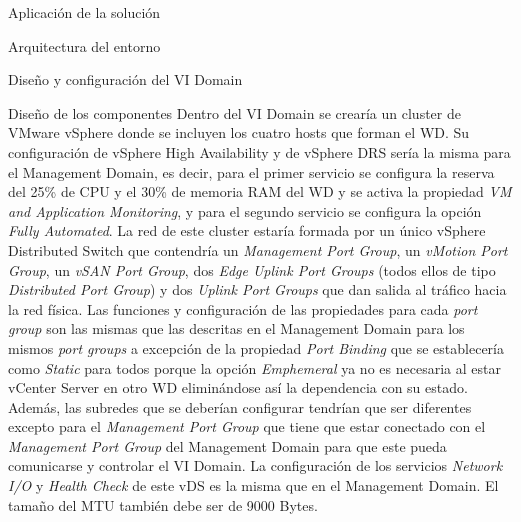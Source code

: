 \begin{chapter}{Aplicación de la solución}
\begin{section}{Arquitectura del entorno}
\begin{subsection}{Diseño y configuración del VI Domain}
\begin{subsubsection}{Diseño de los componentes}
        Dentro del VI Domain se crearía un cluster de VMware vSphere donde se incluyen los cuatro hosts que forman el WD. Su configuración de vSphere High Availability y de vSphere DRS sería la misma para el Management Domain, es decir, para el primer servicio se configura la reserva del 25\% de CPU y el 30\% de memoria RAM del WD y se activa la propiedad \textit{VM and Application Monitoring}, y para el segundo servicio se configura la opción \textit{Fully Automated}. La red de este cluster estaría formada por un único vSphere Distributed Switch que contendría un \textit{Management Port Group}, un \textit{vMotion Port Group}, un \textit{vSAN Port Group}, dos \textit{Edge Uplink Port Groups} (todos ellos de tipo \textit{Distributed Port Group}) y dos \textit{Uplink Port Groups} que dan salida al tráfico hacia la red física. Las funciones y configuración de las propiedades para cada \textit{port group} son las mismas que las descritas en el Management Domain para los mismos \textit{port groups} a excepción de la propiedad \textit{Port Binding} que se establecería como \textit{Static} para todos porque la opción \textit{Emphemeral} ya no es necesaria al estar vCenter Server en otro WD eliminándose así la dependencia con su estado. Además, las subredes que se deberían configurar tendrían que ser diferentes excepto para el \textit{Management Port Group} que tiene que estar conectado con el \textit{Management Port Group} del Management Domain para que este pueda comunicarse y controlar el VI Domain. La configuración de los servicios \textit{Network I/O} y \textit{Health Check} de este vDS es la misma que en el Management Domain. El tamaño del MTU también debe ser de 9000 Bytes.
    \end{subsubsection}

\end{subsection}


\end{section}

\end{chapter}
